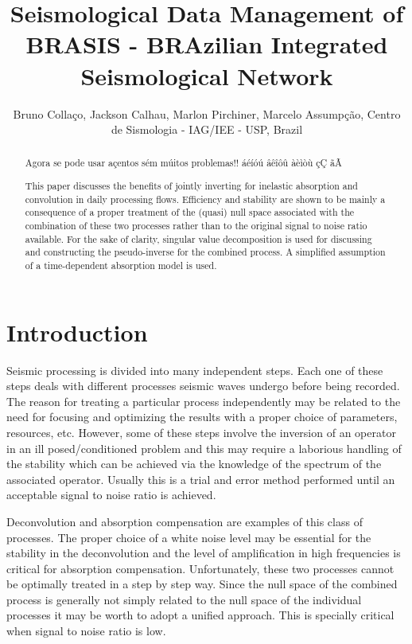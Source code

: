 \documentclass[twoside,letterpaper,twocolumn]{article}
\title{Seismological Data Management of BRASIS -
BRAzilian Integrated Seismological Network}
\author{Bruno Colla\c{c}o, Jackson Calhau, Marlon Pirchiner, Marcelo
Assump\c{c}\~{a}o, Centro de Sismologia - IAG/IEE - USP, Brazil }
\begin{document}
\maketitle

\begin{abstract}

Agora se pode usar açentos sém múitos problemas!!
áéíóú âêîôû àèìòù çÇ ãÃ

This paper discusses the benefits of jointly inverting for inelastic absorption and convolution
in daily processing flows. Efficiency and stability are shown to be mainly a consequence of a 
proper treatment of the (quasi) null space associated with the combination of these two processes rather
than to the original signal to noise ratio available.
For the sake of clarity, singular value decomposition is used for discussing and 
constructing the pseudo-inverse for the combined process. A simplified assumption of a time-dependent
absorption model is used. 

\end{abstract}

\section{Introduction}

Seismic processing is divided into many independent steps. Each one of these steps deals 
with different processes seismic waves undergo before being recorded.
The reason for treating a particular process independently may be related to the need for 
focusing and optimizing the results with a proper choice of 
parameters, resources, etc. However, some of these steps involve the inversion of an operator in an ill 
posed/conditioned problem and this may require a laborious handling of 
the stability which can be achieved via the knowledge of the spectrum of the 
associated operator. Usually this is a trial and error method performed 
until an acceptable signal to noise ratio is achieved. 

Deconvolution and absorption compensation are examples of this class of processes. The proper choice of
a white noise level may be essential for the stability in the deconvolution and
the level of amplification in high frequencies is critical for absorption compensation.
Unfortunately, these two processes cannot be optimally treated in a step by 
step way. Since the null space of the combined process is generally not simply related
to the null space of the individual processes it may be worth to adopt a unified
approach. This is specially critical when signal to noise ratio is low.
\end{document}
